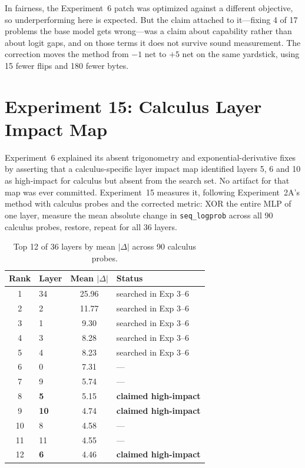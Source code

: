 \documentclass[11pt,a4paper]{article}
\begin{document}
In fairness, the Experiment~6 patch was optimized against a different objective,
so underperforming here is expected. But the claim attached to it---fixing 4 of
17 problems the base model gets wrong---was a claim about capability rather than
about logit gaps, and on those terms it does not survive sound measurement. The
correction moves the method from $-1$ net to $+5$ net on the same yardstick,
using 15 fewer flips and 180 fewer bytes.

\section{Experiment 15: Calculus Layer Impact Map}
\label{sec:exp15}

Experiment~6 explained its absent trigonometry and exponential-derivative fixes
by asserting that a calculus-specific layer impact map identified layers 5, 6 and
10 as high-impact for calculus but absent from the search set. No artifact for
that map was ever committed. Experiment~15 measures it, following
Experiment~2A's method with calculus probes and the corrected metric: XOR the
entire MLP of one layer, measure the mean absolute change in \texttt{seq\_logprob}
across all 90 calculus probes, restore, repeat for all 36 layers.

\begin{table}[h]
\centering
\caption{Top 12 of 36 layers by mean $|\Delta|$ across 90 calculus probes.}
\begin{tabular}{clcl}
\toprule
Rank & Layer & Mean $|\Delta|$ & Status \\
\midrule
1 & 34 & 25.96 & searched in Exp 3--6 \\
2 & 2 & 11.77 & searched in Exp 3--6 \\
3 & 1 & 9.30 & searched in Exp 3--6 \\
4 & 3 & 8.28 & searched in Exp 3--6 \\
5 & 4 & 8.23 & searched in Exp 3--6 \\
6 & 0 & 7.31 & --- \\
7 & 9 & 5.74 & --- \\
8 & \textbf{5} & 5.15 & \textbf{claimed high-impact} \\
9 & \textbf{10} & 4.74 & \textbf{claimed high-impact} \\
10 & 8 & 4.58 & --- \\
11 & 11 & 4.55 & --- \\
12 & \textbf{6} & 4.46 & \textbf{claimed high-impact} \\
\bottomrule
\end{tabular}
\end{table}
\end{document}
